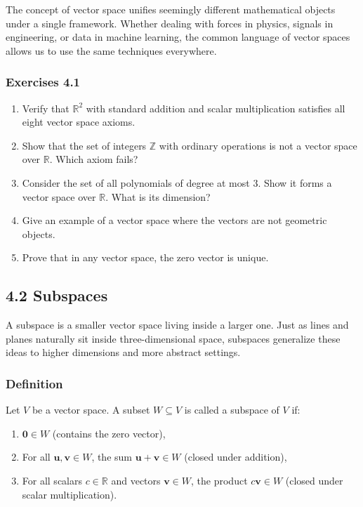 \documentclass[
  12pt,
  a4paper,
]{article}
\begin{document}
The concept of vector space unifies seemingly different mathematical
objects under a single framework. Whether dealing with forces in
physics, signals in engineering, or data in machine learning, the common
language of vector spaces allows us to use the same techniques
everywhere.

\subsubsection{Exercises 4.1}\label{exercises-41}

\begin{enumerate}
\def\labelenumi{\arabic{enumi}.}
\item
  Verify that \(\mathbb{R}^2\) with standard addition and scalar
  multiplication satisfies all eight vector space axioms.
\item
  Show that the set of integers \(\mathbb{Z}\) with ordinary operations
  is not a vector space over \(\mathbb{R}\). Which axiom fails?
\item
  Consider the set of all polynomials of degree at most 3. Show it forms
  a vector space over \(\mathbb{R}\). What is its dimension?
\item
  Give an example of a vector space where the vectors are not geometric
  objects.
\item
  Prove that in any vector space, the zero vector is unique.
\end{enumerate}

\subsection{4.2 Subspaces}\label{42-subspaces}

A subspace is a smaller vector space living inside a larger one. Just as
lines and planes naturally sit inside three-dimensional space, subspaces
generalize these ideas to higher dimensions and more abstract settings.

\subsubsection{Definition}\label{definition-2}

Let \(V\) be a vector space. A subset \(W \subseteq V\) is called a
subspace of \(V\) if:

\begin{enumerate}
\def\labelenumi{\arabic{enumi}.}
\item
  \(\mathbf{0} \in W\) (contains the zero vector),
\item
  For all \(\mathbf{u}, \mathbf{v} \in W\), the sum
  \(\mathbf{u} + \mathbf{v} \in W\) (closed under addition),
\item
  For all scalars \(c \in \mathbb{R}\) and vectors \(\mathbf{v} \in W\),
  the product \(c\mathbf{v} \in W\) (closed under scalar
  multiplication).
\end{enumerate}
\end{document}
